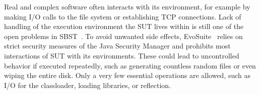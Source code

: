 \documentclass{article}
\begin{document}

Real and complex software often interacts with its environment, for example by making I/O calls to the file system or establishing TCP connections. Lack of handling of the execution environment the \ac{SUT} lives within is still one of the open problems in \ac{SBST}~\cite{McMinn2011}. To avoid unwanted side effects, EvoSuite~\cite{Fraser2013a} relies on strict security measures of the Java Security Manager and prohibits most interactions of \ac{SUT} with its environments. These could lead to uncontrolled behavior if executed repeatedly, such as generating countless random files or even wiping the entire disk. Only a very few essential operations are allowed, such as I/O for the classloader, loading libraries, or reflection. 

\end{document}
